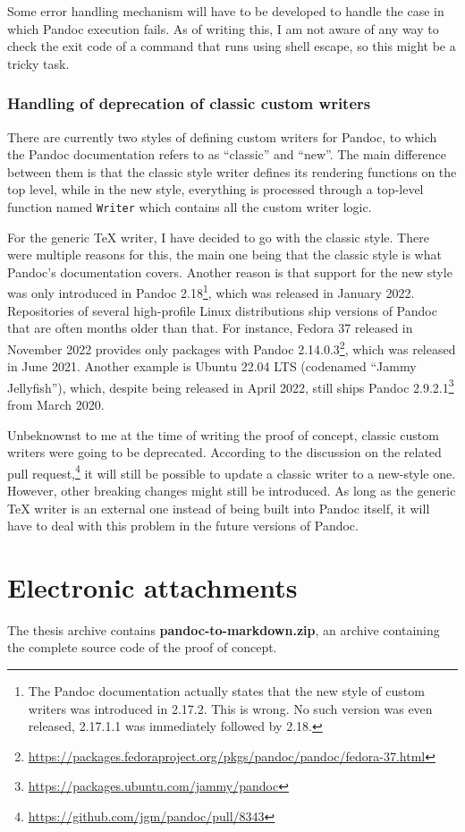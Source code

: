 \documentclass[
  digital,     %
  oneside,     %
  nosansbold,  %
  nocolorbold, %
  lof,         %
  nolot,       %
]{fithesis4}
\begin{document}
\noindent
Some error handling mechanism will have to be developed to handle the case in which Pandoc execution fails. As of writing this, I am not aware of any way to check the exit code of a command that runs using shell escape, so this might be a tricky task.

\subsection{Handling of deprecation of classic custom writers}
There are currently two styles of defining custom writers for Pandoc, to which the Pandoc documentation refers to as ``classic'' and ``new''. The main difference between them is that the classic style writer defines its rendering functions on the top level, while in the new style, everything is processed through a top-level function named \texttt{Writer} which contains all the custom writer logic.

For the generic \TeX{} writer, I have decided to go with the classic style. There were multiple reasons for this, the main one being that the classic style is what Pandoc's documentation covers. Another reason is that support for the new style was only introduced in Pandoc 2.18\footnote{The Pandoc documentation actually states that the new style of custom writers was introduced in 2.17.2. This is wrong. No such version was even released, 2.17.1.1 was immediately followed by 2.18.}, which was released in January 2022. Repositories of several high-profile Linux distributions ship versions of Pandoc that are often months older than that. For instance, Fedora 37 released in November 2022 provides only packages with Pandoc 2.14.0.3\footnote{\url{https://packages.fedoraproject.org/pkgs/pandoc/pandoc/fedora-37.html}}, which was released in June 2021. Another example is Ubuntu 22.04 LTS (codenamed ``Jammy Jellyfish''), which, despite being released in April 2022, still ships Pandoc 2.9.2.1\footnote{\url{https://packages.ubuntu.com/jammy/pandoc}} from March 2020.

Unbeknownst to me at the time of writing the proof of concept, classic custom writers were going to be deprecated. According to the discussion on the related pull request,\footnote{\url{https://github.com/jgm/pandoc/pull/8343}} it will still be possible to update a classic writer to a new-style one. However, other breaking changes might still be introduced. As long as the generic \TeX{} writer is an external one instead of being built into Pandoc itself, it will have to deal with this problem in the future versions of Pandoc.

\printbibliography[heading=bibintoc] %

\makeatletter\thesis@blocks@clear\makeatother

\appendix %
\chapter{Electronic attachments}
The thesis archive contains \textbf{pandoc-to-markdown.zip}, an archive containing the complete source code of the proof of concept.
\end{document}
